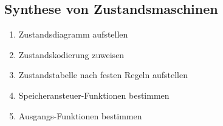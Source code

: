 \subsection{Synthese von Zustandsmaschinen}
	\begin{multicols}{2}
		\begin{enumerate}
			\setlength{\itemsep}{1pt}
			\setlength{\parskip}{0pt}
			\setlength{\parsep}{0pt}
			\item Zustandsdiagramm aufstellen
			\item Zustandskodierung zuweisen
			\item Zustandstabelle nach festen Regeln aufstellen
			\item Speicheransteuer-Funktionen bestimmen
			\item Ausgangs-Funktionen bestimmen
		\end{enumerate}
	\end{multicols}